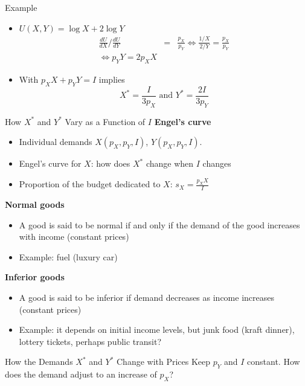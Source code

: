 \documentclass[handout]{beamer}
\newenvironment{iPar}[1]{\textbf{#1} \begin{itemize}}{\end{itemize}}
\begin{document}
\begin{frame}{Example}
\begin{itemize}
\item $U(X,Y) = \log X +  2\log Y$ \pause
\begin{eqnarray*}\frac{dU}{dX}\Bigg/\frac{dU}{dY} &=& \frac{p_X}{p_Y} \iff \frac{1/X}{2/Y} = \frac{p_X}{p_Y} \\ \iff  p_Y Y = 2p_X X \end{eqnarray*}
\item With $p_X X + p_Y Y =  I$ implies $$X^* = \frac{I}{3p_X} \textrm{ and } Y^* = \frac{2I}{3p_Y}$$

\end{itemize}
\end{frame}


\begin{frame}{How $X^*$ and $Y^*$ Vary as a Function of $I$}
\begin{iPar}{Engel's curve}
\item Individual demands  $X(p_X,p_Y,I)$, $Y(p_X,p_Y,I)$.
\item Engel's curve for $X$: how does $X^*$ change when $I$ changes
\item Proportion of the budget dedicated to $X$: $s_X = \frac{p_X X}{I}$
\end{iPar} 

\begin{iPar}{Normal goods}
\item A good is said to be normal if and only if the demand of the good increases with income (constant prices)
\item Example: fuel (luxury car)
\end{iPar}

\begin{iPar}{Inferior goods}
\item A good is said to be inferior if demand decreases as income increases (constant prices)
\item Example:  it depends on initial income levels, but junk food (kraft dinner), lottery tickets, perhaps public transit?
\end{iPar}

\end{frame}

\begin{frame}{How the Demands $X^*$ and $Y^*$ Change with Prices}
Keep $p_Y$ and $I$ constant. How does the demand adjust to an increase of $p_X$? 

\end{frame}
\end{document}
